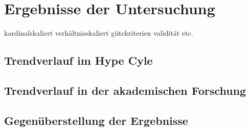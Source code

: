 \section{Ergebnisse der Untersuchung}

kardinalskaliert
verhältnisskaliert
gütekriterien validität etc.
\subsection{Trendverlauf im Hype Cyle}


\subsection{Trendverlauf in der akademischen Forschung}
\subsection{Gegenüberstellung der Ergebnisse}